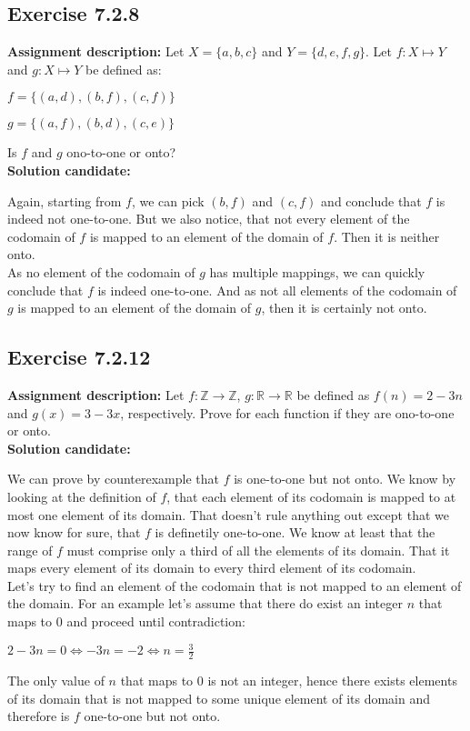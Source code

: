 \documentclass{report}
\newcommand{\cent}[1]{\begin{center}#1\end{center}}
\newcommand{\doubleR}{\mathbb{R}}
\newcommand{\doubleZ}{\mathbb{Z}}
\newcommand{\AssignmentDescription}{\textbf{Assignment description: }}
\newcommand{\Solution}{\textbf{Solution candidate: }}
\newcommand{\Exercise}[1]{\subsection{Exercise #1}}
\begin{document}
 	\Exercise{7.2.8}
 	
 	\AssignmentDescription
 	Let $X = \{a,b,c\}$ and $Y = \{d,e,f,g\}$. Let $f : X \mapsto Y$ and $g : X \mapsto Y$ be defined as:
 	
 	\cent{$f = \{(a,d),(b,f),(c,f)\}$}
 	\cent{$g = \{(a,f),(b,d),(c,e)\}$}
 	
 	Is $f$ and $g$ ono-to-one or onto?\\
 	
 	\Solution
 	
 	Again, starting from $f$, we can pick $(b,f)$ and $(c,f)$ and conclude that $f$ is indeed not one-to-one. But we also notice, that not every element of the codomain of $f$ is mapped to an element of the domain of $f$. Then it is neither onto.\\
 	
 	As no element of the codomain of $g$ has multiple mappings, we can quickly conclude that $f$ is indeed one-to-one. And as not all elements of the codomain of $g$ is mapped to an element of the domain of $g$, then it is certainly not onto.
 	
 	\Exercise{7.2.12}
 	
 	\AssignmentDescription
 	Let $f : \doubleZ \to \doubleZ$, $g : \doubleR \to \doubleR $ be defined as $f(n) = 2-3n$ and $g(x) = 3-3x$, respectively. Prove for each function if they are ono-to-one or onto.\\
 	
 	\Solution
 	
 	We can prove by counterexample that $f$ is one-to-one but not onto. We know by looking at the definition of $f$, that each element of its codomain is mapped to at most one element of its domain. That doesn't rule anything out except that we now know for sure, that $f$ is definetily one-to-one. We know at least that the range of $f$ must comprise only a third of all the elements of its domain. That it maps every element of its domain to every third element of its codomain.\\
 	
 	Let's try to find an element of the codomain that is not mapped to an element of the domain. For an example let's assume that there do exist an integer $n$ that maps to 0 and proceed until contradiction:
 	
 	\cent{$2-3n=0 \Leftrightarrow -3n=-2 \Leftrightarrow n = \frac{3}{2}$}
 	
 	The only value of $n$ that maps to 0 is not an integer, hence there exists elements of its domain that is not mapped to some unique element of its domain and therefore is $f$ one-to-one but not onto.\\
 	
\end{document}
